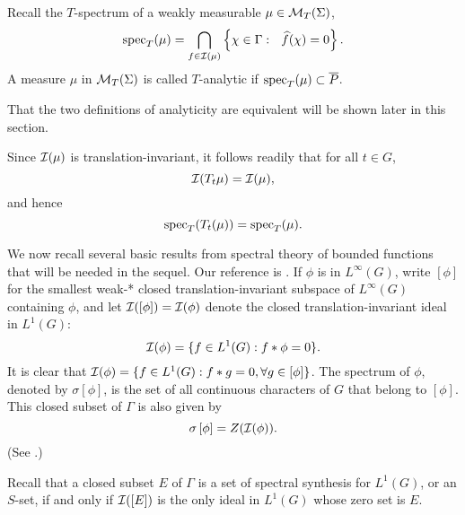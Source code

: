 \documentclass[12pt,leqno]{article}
\def\cI{{\cal I}}
\def\Linfg{L^\infty (G)}
\def\cMT{{\cal M}_T(\Sigma)}
\begin{document}
\begin{defin}
Recall the $T$-spectrum of a 
weakly measurable $\mu\in \cMT$, 
\begin{equation}
{\rm spec}_T (\mu)= \bigcap_{f\in \cI(\mu)}
\left\{
\chi\in\Gamma:\ \ \widehat{f}(\chi)=0
\right\}.
\label{spect}
\end{equation}
A measure $\mu$ in $\cMT$ is called $T$-analytic if
${\rm spec}_T (\mu)\subset \overline{P}$.


\label{weakly-analytic}
\end{defin}

That the two definitions of analyticity are
equivalent will be shown later in this section.



Since $\cI(\mu)$ is translation-invariant,
it follows readily that 
for all $t\in G$,
$$\cI(T_t\mu)=\cI(\mu),$$
and hence
\begin{equation}
{\rm spec}_T (T_t(\mu))={\rm spec}_T (\mu).
\label{feb.4.95}
\end{equation}





We now recall several 
basic results from 
spectral theory of bounded functions that will be needed in the sequel.  Our reference is \cite[Section 40]{hr2}.  
If 
$\phi$ is in $\Linfg$, write $\left[ \phi\right]$ 
for the smallest weak-* closed translation-invariant subspace of $\Linfg$ 
containing $\phi$, and let $\cI([\phi])=\cI (\phi)$ 
denote the closed translation-invariant ideal in $L^1(G)$:\\
$$ \cI (\phi)=\{f\in L^1(G): f*\phi=0\}.$$
It is clear that 
$ \cI (\phi)=\{f\in L^1(G): f*g=0, \forall g\in \left[\phi\right]\}$. 
The spectrum of $\phi$, denoted by 
$\sigma \left[\phi\right]$, 
is the set of all continuous characters of $G$ 
that belong to $\left[\phi\right]$.  
This closed subset of $\Gamma$ is also given by 
\begin{equation}
\sigma \left[\phi\right]=Z(\cI(\phi)). 
\label{spec}
\end{equation}
(See \cite[Theorem (40.5)]{hr2}.)  



Recall that a closed subset $E$ of $\Gamma$ is 
a set of spectral synthesis for $L^1(G)$, or an $S$-set, if and only if
$\cI([E])$ is the only ideal in $L^1(G)$ whose zero set
is $E$.  
 
\end{document}
